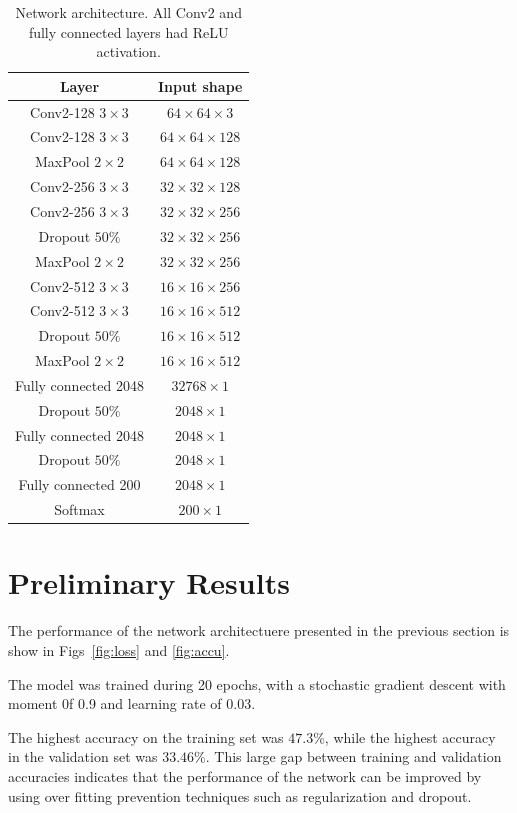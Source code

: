 \documentclass[10pt,twocolumn,letterpaper]{article}
\begin{document}
\begin{table}[t]
	\caption{Network architecture. All Conv2 and fully connected layers had ReLU activation.}
	\label{tab:network}
	\centering
	\begin{tabular}{c|c}
		\hline
		Layer & Input shape \\
		\hline
		Conv2-128 $3\times 3$ & $64\times64\times 3$ \\
		Conv2-128 $3\times 3$ & $64\times64\times 128$ \\
		MaxPool $2 \times 2$ & $64\times64\times 128$\\
		\hline
		Conv2-256 $3\times 3$ & $32\times32\times 128$ \\
		Conv2-256 $3\times 3$ & $32\times32\times 256$ \\
		Dropout $50\%$ & $32\times32\times 256$ \\
		MaxPool $2 \times 2$ & $32\times32\times 256$\\
		\hline
		Conv2-512 $3\times 3$ & $16\times16\times 256$ \\
		Conv2-512 $3\times 3$ & $16\times16\times 512$ \\
		Dropout $50\%$ & $16\times16\times 512$ \\
		MaxPool $2 \times 2$ & $16\times16\times 512$\\
		\hline
		Fully connected 2048 & $32768\times 1$ \\
		Dropout $50\%$ & $2048 \times 1$ \\
		Fully connected 2048 & $2048\times 1$ \\
		Dropout $50\%$ & $2048 \times 1$ \\
		Fully connected 200 & $2048\times 1$ \\
		\hline
		Softmax & $200 \times 1$  \\
		\hline
	\end{tabular}
\end{table}

\section{Preliminary Results}
The performance of the network architectuere presented in the previous section is show in Figs~\ref{fig:loss} and \ref{fig:accu}. 

The model was trained during 20 epochs, with a stochastic gradient descent with moment 0f 0.9 and learning rate of 0.03. 

The highest accuracy on the training set was $47.3\%$, while the highest accuracy in the validation set was $33.46\%$. This large gap between training and validation accuracies indicates that the performance of the network can be improved by using over fitting prevention techniques such as regularization and dropout.
\end{document}
